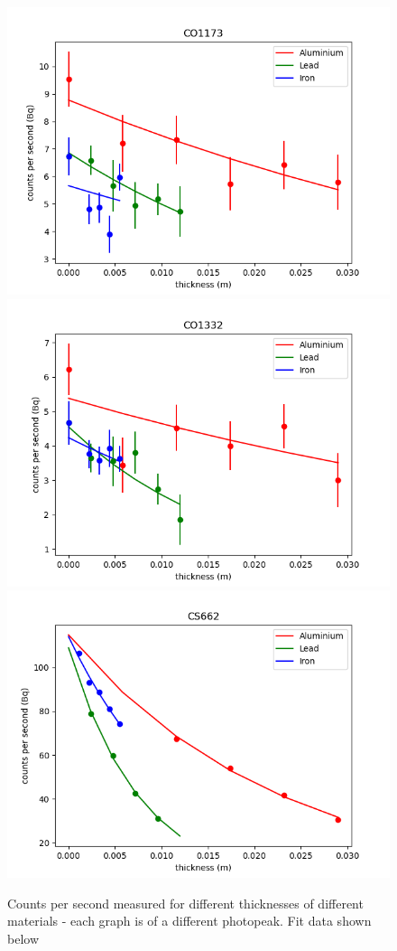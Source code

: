 \documentclass[12pt, a4paper]{article}
\begin{document}
\begin{figure}[H]
		\includegraphics[scale=0.4]{assets/CO1173.png}
		\includegraphics[scale=0.4]{assets/CO1332.png}
		\includegraphics[scale=0.4]{assets/CS662.png}
		\caption{Counts per second measured for different thicknesses of different materials - each graph is of a different photopeak. Fit data shown below}
	\end{figure}
\end{document}
